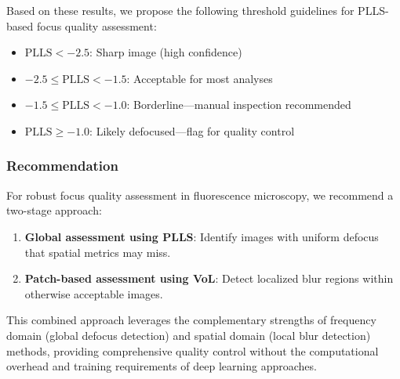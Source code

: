 Based on these results, we propose the following threshold guidelines for PLLS-based focus quality assessment:
\begin{itemize}
    \item $\text{PLLS} < -2.5$: Sharp image (high confidence)
    \item $-2.5 \leq \text{PLLS} < -1.5$: Acceptable for most analyses
    \item $-1.5 \leq \text{PLLS} < -1.0$: Borderline---manual inspection recommended
    \item $\text{PLLS} \geq -1.0$: Likely defocused---flag for quality control
\end{itemize}

\subsubsection{Recommendation}

For robust focus quality assessment in fluorescence microscopy, we recommend a two-stage approach:
\begin{enumerate}
    \item \textbf{Global assessment using PLLS}: Identify images with uniform defocus that spatial metrics may miss.
    \item \textbf{Patch-based assessment using VoL}: Detect localized blur regions within otherwise acceptable images.
\end{enumerate}

This combined approach leverages the complementary strengths of frequency domain (global defocus detection) and spatial domain (local blur detection) methods, providing comprehensive quality control without the computational overhead and training requirements of deep learning approaches.



